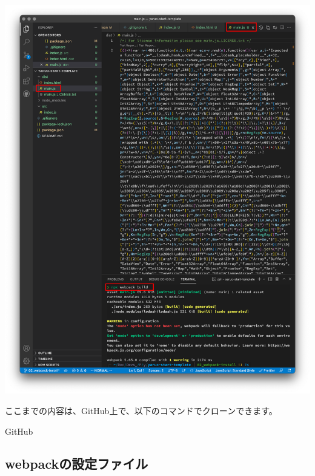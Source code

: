 \begin{reviewimage}%
\includegraphics[width=1.0\maxwidth]{./images/02-create-react-app/webpack_test03.png}%
\label{image:02-create-react-app:webpack_test03}
\end{reviewimage}
\begin{starternote}[]{}

ここまでの内容は、GitHub上で、以下のコマンドでクローンできます。

\def\startercodeblockfontsize{}
\begin{starterterminal}[]{GitHub}\end{starterterminal}
\end{starternote}

\subsection{webpackの設定ファイル}
\keeplastskip{
  \label{sec:2-2-4}
  \label{04-webpack-config}
  \par\nobreak
}

